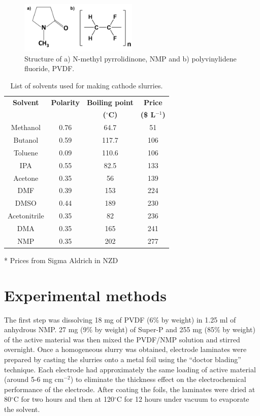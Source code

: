 \begin{figure}[tbh!]
\centering
\includegraphics[width=0.5\textwidth]{Figures/chap7fig/nmppvdf}
\caption{Structure of a) N-methyl pyrrolidinone, NMP and b) polyvinylidene fluoride, PVDF.}
\label{Figures/chap7fig:nmppvdf}
\end{figure}

\begin{table}
\centering
\caption{List of solvents used for making cathode slurries.} \label{tab1}
\begin{threeparttable}
\begin{tabular}{|c|c|c|c|} 
\hline
\textbf{Solvent} & \textbf{Polarity} & \textbf{Boiling point} & \textbf{Price}\\
\textbf{} & \textbf{} & \textbf{($^{\circ}$C)} & \textbf{(\$ L$^{-1}$)}\\
\hline
Methanol & 0.76 & 64.7 & 51 \\ 
Butanol & 0.59 & 117.7 & 106 \\
Toluene & 0.09 & 110.6 & 106 \\
IPA & 0.55 & 82.5 & 133 \\
Acetone & 0.35 & 56 & 139 \\
DMF & 0.39 & 153 & 224 \\
DMSO & 0.44 & 189 & 230 \\
Acetonitrile & 0.35 & 82 & 236 \\
DMA & 0.35 & 165 & 241 \\
NMP & 0.35 & 202 & 277 \\
 \hline
\end{tabular}
\begin{tablenotes}
\item[*] Prices from Sigma Aldrich in NZD
\end{tablenotes}
\end{threeparttable}
\end{table}

\section{Experimental methods}

The first step was dissolving 18 mg of PVDF (6\% by weight) in 1.25 ml of anhydrous NMP. 27 mg (9\% by weight) of Super-P and 255 mg (85\% by weight) of the active material was then mixed the PVDF/NMP solution and stirred overnight. Once a homogeneous slurry was obtained, electrode laminates were prepared by casting the slurries onto a metal foil using the \enquote{doctor blading} technique. Each electrode had approximately the same loading of active material (around 5-6 mg cm$^{-2}$) to eliminate the thickness effect on the electrochemical performance of the electrode. After coating the foils, the laminates were dried at 80$^{\circ}$C for two hours and then at 120$^{\circ}$C for 12 hours under vacuum to evaporate the solvent. 
